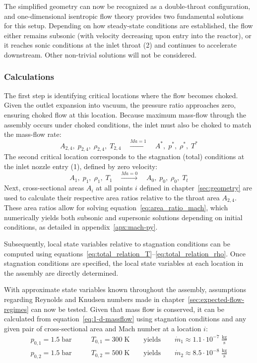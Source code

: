 The simplified geometry can now be recognized as a double-throat configuration, and one-dimensional isentropic flow theory provides two fundamental solutions for this setup.
Depending on how steady-state conditions are established, the flow either remains subsonic (with velocity decreasing upon entry into the reactor), or it reaches sonic conditions at the inlet throat (2) and continues to accelerate downstream.
Other non-trivial solutions will not be considered.
\cite{SALAS1986193, EMMONS1958}

\subsubsection*{Calculations}
	The first step is identifying critical locations where the flow becomes choked.
	Given the outlet expansion into vacuum, the pressure ratio approaches zero, ensuring choked flow at this location.
	Because maximum mass-flow through the assembly occurs under choked conditions, the inlet must also be choked to match the mass-flow rate:
	$$
		A_{2,4},\;p_{2,4},\;\rho_{2,4},\;T_{2,4}
			\quad \xrightarrow {Ma = 1} \quad
		A^*,\;p^*,\;\rho^*,\;T^*
	$$
	The second critical location corresponds to the stagnation (total) conditions at the inlet nozzle entry (1), defined by zero velocity:
	$$
		A_1,\;p_1,\;\rho_1,\;T_1
			\quad \xrightarrow{Ma=0} \quad
		A_0,\;p_0,\;\rho_0,\;T_t
	$$
	Next, cross-sectional areas $A_i$ at all points $i$ defined in chapter~\ref{sec:geometry} are used to calculate their respective area ratios relative to the throat area $A_{2,4}$.
	These area ratios allow for solving equation~\eqref{eq:area_ratio_mach}, which numerically yields both subsonic and supersonic solutions depending on initial conditions, as detailed in appendix~\ref{apx:mach-py}.

	Subsequently, local state variables relative to stagnation conditions can be computed using equations~\eqref{eq:total_relation_T}–\eqref{eq:total_relation_rho}.
	Once stagnation conditions are specified, the local state variables at each location in the assembly are directly determined.

	

	With approximate state variables known throughout the assembly, assumptions regarding Reynolds and Knudsen numbers made in chapter~\ref{sec:expected-flow-regimes} can now be tested.
	Given that mass flow is conserved, it can be calculated from equation~\eqref{eq:1-d-massflow} using stagnation conditions and any given pair of cross-sectional area and Mach number at a location $i$:
	\begin{align*}
		p_{0,1} = 1.5\;\text{bar}
			&\qquad T_{0,1} = 300\;\text{K}
				\qquad \text{yields} \qquad
			\dot{m}_1 \approx 1.1 \cdot 10^{-7} \; \frac{\text{kg}}{\text{s}}\\
		p_{0,2} = 1.5\;\text{bar}
			&\qquad T_{0,2} = 500\;\text{K}
				\qquad \text{yields} \qquad
			\dot{m}_2 \approx 8.5 \cdot 10^{-8} \; \frac{\text{kg}}{\text{s}}
	\end{align*}

